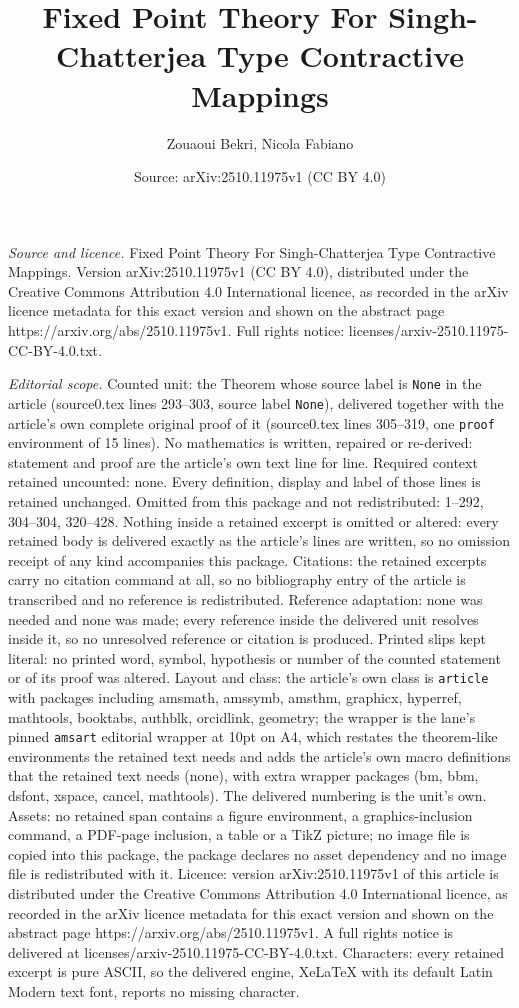 \documentclass[10pt,a4paper]{amsart}
\title[Fixed Point Theory For Singh-Chatterjea Type Contractive Map]{Fixed Point Theory For Singh-Chatterjea Type Contractive Mappings}
\author{Zouaoui Bekri, Nicola Fabiano}
\date{Source: arXiv:2510.11975v1 (CC BY 4.0)}
\begin{document}
\maketitle

\noindent\emph{Source and licence.} Fixed Point Theory For Singh-Chatterjea Type Contractive Mappings. Version arXiv:2510.11975v1 (CC BY 4.0), distributed under the Creative Commons Attribution 4.0 International licence, as recorded in the arXiv licence metadata for this exact version and shown on the abstract page https://arxiv.org/abs/2510.11975v1. Full rights notice: licenses/arxiv-2510.11975-CC-BY-4.0.txt.\par\smallskip

\noindent\textit{Editorial scope.} Counted unit: the Theorem whose source label is \texttt{None} in the article (source0.tex lines 293--303, source label \texttt{None}), delivered together with the article's own complete original proof of it (source0.tex lines 305--319, one \texttt{proof} environment of 15 lines). No mathematics is written, repaired or re-derived: statement and proof are the article's own text line for line. Required context retained uncounted: none. Every definition, display and label of those lines is retained unchanged. Omitted from this package and not redistributed: 1--292, 304--304, 320--428. Nothing inside a retained excerpt is omitted or altered: every retained body is delivered exactly as the article's lines are written, so no omission receipt of any kind accompanies this package. Citations: the retained excerpts carry no citation command at all, so no bibliography entry of the article is transcribed and no reference is redistributed. Reference adaptation: none was needed and none was made; every reference inside the delivered unit resolves inside it, so no unresolved reference or citation is produced. Printed slips kept literal: no printed word, symbol, hypothesis or number of the counted statement or of its proof was altered. Layout and class: the article's own class is \texttt{article} with packages including amsmath, amssymb, amsthm, graphicx, hyperref, mathtools, booktabs, authblk, orcidlink, geometry; the wrapper is the lane's pinned \texttt{amsart} editorial wrapper at 10pt on A4, which restates the theorem-like environments the retained text needs and adds the article's own macro definitions that the retained text needs (none), with extra wrapper packages (bm, bbm, dsfont, xspace, cancel, mathtools). The delivered numbering is the unit's own. Assets: no retained span contains a figure environment, a graphics-inclusion command, a PDF-page inclusion, a table or a TikZ picture; no image file is copied into this package, the package declares no asset dependency and no image file is redistributed with it. Licence: version arXiv:2510.11975v1 of this article is distributed under the Creative Commons Attribution 4.0 International licence, as recorded in the arXiv licence metadata for this exact version and shown on the abstract page https://arxiv.org/abs/2510.11975v1. A full rights notice is delivered at licenses/arxiv-2510.11975-CC-BY-4.0.txt. Characters: every retained excerpt is pure ASCII, so the delivered engine, XeLaTeX with its default Latin Modern text font, reports no missing character.
\end{document}
